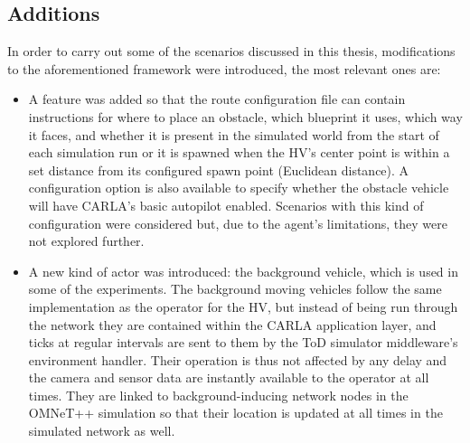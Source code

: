 \subsection{Additions}
In order to carry out some of the scenarios discussed in this thesis, modifications to the aforementioned framework were introduced, the most relevant ones are:
\begin{itemize}
    \item A feature was added so that the route configuration file can contain instructions for where to place an obstacle, which blueprint it uses, which way it faces, and whether it is present in the simulated world from the start of each simulation run or it is spawned when the HV's center point is within a set distance from its configured spawn point (Euclidean distance). A configuration option is also available to specify whether the obstacle vehicle will have CARLA's basic autopilot enabled. Scenarios with this kind of configuration were considered but, due to the agent's limitations, they were not explored further.

    \item A new kind of actor was introduced: the background vehicle, which is used in some of the experiments. The background moving vehicles follow the same implementation as the operator for the HV, but instead of being run through the network they are contained within the CARLA application layer, and ticks at regular intervals are sent to them by the ToD simulator middleware's environment handler. Their operation is thus not affected by any delay and the camera and sensor data are instantly available to the operator at all times. They are linked to background-inducing network nodes in the OMNeT++ simulation so that their location is updated at all times in the simulated network as well.
\end{itemize}

